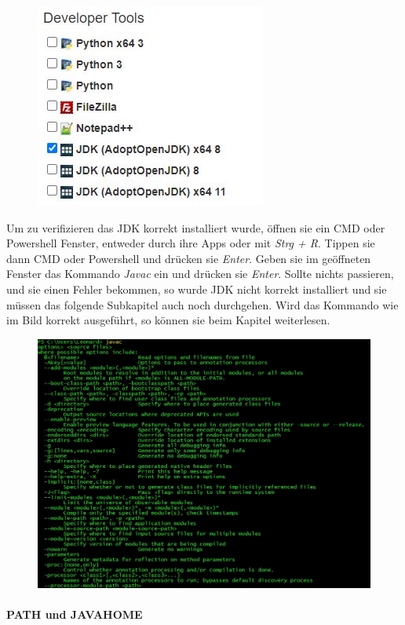 \documentclass[fontsize=12pt,paper=a4,twoside]{scrartcl}
\begin{document}
\begin{figure}[h!]
\centering
\includegraphics[width=0.5\linewidth]{Windows.JPG}
\end{figure}

Um zu verifizieren das JDK korrekt installiert wurde, öffnen sie ein CMD oder Powershell Fenster, entweder durch ihre Apps oder mit \textit{Strg + R}. Tippen sie dann CMD oder Powershell und drücken sie \textit{Enter}. Geben sie im geöffneten Fenster das Kommando \textit{Javac} ein und drücken sie \textit{Enter}. Sollte nichts passieren, und sie einen Fehler bekommen, so wurde JDK nicht korrekt installiert und sie müssen das folgende Subkapitel auch noch durchgehen. Wird das Kommando wie im Bild korrekt ausgeführt, so können sie beim Kapitel  weiterlesen. 

\begin{figure}[h!]
\centering
\includegraphics[width=\linewidth]{JavacWindows.JPG}
\end{figure}


\newpage
\paragraph{PATH und JAVA\textunderscore HOME}
\end{document}
